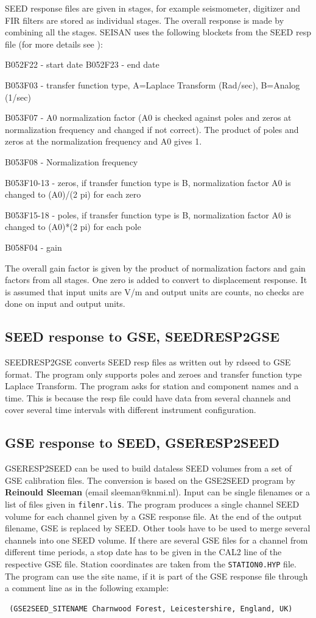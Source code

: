 SEED response files are given in stages, for example seismometer, digitizer and FIR filters are stored as individual stages. The overall response is made by combining all the stages. SEISAN uses the following blockets from the SEED resp file (for more details see \citet{iris1993}):

B052F22 - start date \newline
B052F23 - end date 

B053F03 - transfer function type, A=Laplace Transform (Rad/sec), B=Analog (1/sec) 

B053F07 - A0 normalization factor (A0 is checked against poles and zeros at normalization frequency and changed if not correct). The product of poles and zeros at the normalization frequency and A0 gives 1. 

B053F08 - Normalization frequency 

B053F10-13 - zeros, if transfer function type is B, normalization factor A0 is changed to (A0)/(2 pi) for each zero 

B053F15-18 - poles, if transfer function type is B, normalization factor A0 is changed to (A0)*(2 pi) for each pole 

B058F04 - gain 

The overall gain factor is given by the product of normalization factors and gain factors from all stages. One zero is added to convert to displacement response. It is assumed that input units are V/m and output units are counts, no checks are done on input and output units. 

\subsection{SEED response to GSE, SEEDRESP2GSE} 

SEEDRESP2GSE converts SEED resp files as written out by rdseed to GSE format. The program only supports poles and zeroes and transfer function type Laplace Transform. The program asks for station and component names and a time. This is because the resp file could have data from several channels and cover several time intervals with different instrument configuration. 

\subsection{GSE response to SEED, GSERESP2SEED} 

GSERESP2SEED can be used to build dataless SEED volumes from a set of 
GSE calibration files. The conversion is based on the GSE2SEED 
program by \textbf{Reinould Sleeman} (email sleeman@knmi.nl). Input can 
be single filenames or a list of files given in \texttt{filenr.lis}. The program produces a single channel SEED volume for each channel given by a GSE response file. At the end of the output filename, GSE is replaced by SEED. Other tools have to be used to merge several channels into one SEED volume. If there are several GSE files for a channel from different time periods, a stop date has to be given in the CAL2 line of the respective GSE file. Station coordinates are taken from the \texttt{STATION0.HYP} file. The program can use the site name, if it is part of the GSE response file through a comment line as in the following example: 

\begin{verbatim}
 (GSE2SEED_SITENAME Charnwood Forest, Leicestershire, England, UK) 
\end{verbatim}

